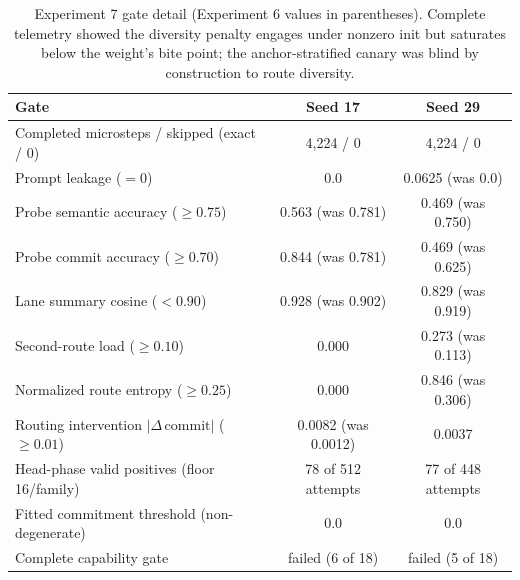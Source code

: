 \documentclass[10pt,a4paper]{article}
\newcommand{\fail}[1]{\textcolor{failred}{#1}}
\newcommand{\good}[1]{\textcolor{okgreen}{#1}}
\begin{document}
\begin{table}[htbp]
\caption{Experiment 7 gate detail (Experiment 6 values in parentheses). Complete telemetry showed the diversity penalty engages under nonzero init but saturates below the weight's bite point; the anchor-stratified canary was blind by construction to route diversity.}
\label{tab:app-exp7-gates}
\centering\footnotesize
\begin{tabularx}{\textwidth}{@{}Xcc@{}}
\toprule
Gate & Seed 17 & Seed 29 \\
\midrule
Completed microsteps / skipped (exact / 0) & 4{,}224 / 0 & 4{,}224 / 0 \\
Prompt leakage ($= 0$) & 0.0 & \fail{0.0625} (was 0.0) \\
Probe semantic accuracy ($\geq 0.75$) & \fail{0.563} (was 0.781) & \fail{0.469} (was 0.750) \\
Probe commit accuracy ($\geq 0.70$) & \good{0.844} (was 0.781) & \fail{0.469} (was 0.625) \\
Lane summary cosine ($< 0.90$) & \fail{0.928} (was 0.902) & \good{0.829} (was 0.919) \\
Second-route load ($\geq 0.10$) & \fail{0.000} & 0.273 (was 0.113) \\
Normalized route entropy ($\geq 0.25$) & \fail{0.000} & 0.846 (was 0.306) \\
Routing intervention $\lvert\Delta\,\mathrm{commit}\rvert$ ($\geq 0.01$) & \fail{0.0082} (was 0.0012) & \fail{0.0037} \\
Head-phase valid positives (floor 16/family) & 78 of 512 attempts & 77 of 448 attempts \\
Fitted commitment threshold (non-degenerate) & \fail{0.0} & \fail{0.0} \\
Complete capability gate & \fail{failed (6 of 18)} & \fail{failed (5 of 18)} \\
\bottomrule
\end{tabularx}
\end{table}
\end{document}

